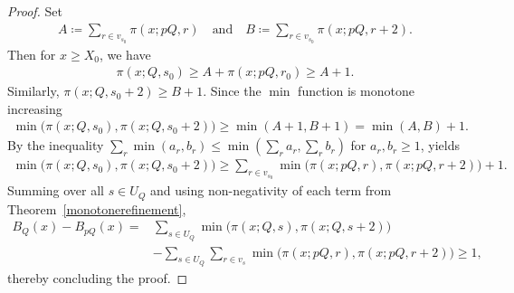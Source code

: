 \documentclass[10pt,a4paper]{amsart}
\begin{document}
\begin{proof}
\medskip
Set
\begin{align*}
A
\coloneqq\sum_{r\in v_{s_0}}\pi(x;pQ,r)\quad\text{and}\quad
B
\coloneqq\sum_{r\in v_{s_0}}\pi(x;pQ,r+2).
\end{align*}
Then for $x\geq X_0$, we have
\begin{align*}
\pi(x;Q,s_0)
\geq A +\pi(x;pQ,r_0)\geq A+1.
\end{align*}
Similarly, $\pi(x;Q,s_0+2)\geq B+1$. Since the $\min$ function is monotone increasing
\begin{align*}
\min\bigl(\pi(x; Q, s_0),\pi(x; Q, s_0 + 2)\bigr)
\geq\min(A+1, B+1) 
=\min(A,B)+1.    
\end{align*}
By the inequality $\sum_{r}\min(a_r,b_r)\leq\min(\sum_{r}a_r,\sum_{r}b_r)$ for $a_r,b_r\geq 1$, yields
\begin{align*}
\min\bigl(\pi(x;Q,s_0),\pi(x; Q, s_0 + 2)\bigr)
\geq\sum_{r\in v_{s_0}}\min\bigl(\pi(x;pQ,r),\pi(x;pQ,r+2)\bigr)+1.    
\end{align*}
Summing over all $s\in U_Q$ and using non-negativity of each term from Theorem~\ref{monotonerefinement}, 
\begin{align*}
B_Q(x)-B_{pQ}(x)
=&\sum_{s\in U_Q}\min\bigl(\pi(x;Q,s),\pi(x;Q,s+2)\bigr)\\
&-\sum_{s\in U_Q}\sum_{r\in v_s} \min\bigl(\pi(x;pQ,r),\pi(x;pQ,r+2)\bigr)
\ge 1,    
\end{align*}
thereby concluding the proof.
\end{proof}
\end{document}
